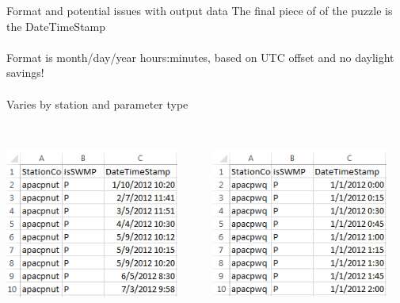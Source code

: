 \documentclass[xcolor=svgnames]{beamer}\usepackage[]{graphicx}\usepackage[]{color}
\begin{document}
\begin{frame}{Format and potential issues with output data}
The final piece of of the puzzle is the DateTimeStamp \\~\\
Format is month/day/year hours:minutes, based on UTC offset and no daylight savings!\\~\\
Varies by station and parameter type \\~\\
\begin{columns}[t]
\begin{column}{0.4\textwidth}
\centerline{\includegraphics[width = 0.9\textwidth]{timestamp_ex1.png}}
\end{column}
\begin{column}{0.4\textwidth}
\centerline{\includegraphics[width = 0.9\textwidth]{timestamp_ex2.png}}
\end{column}
\end{columns}
\end{frame}
\end{document}
